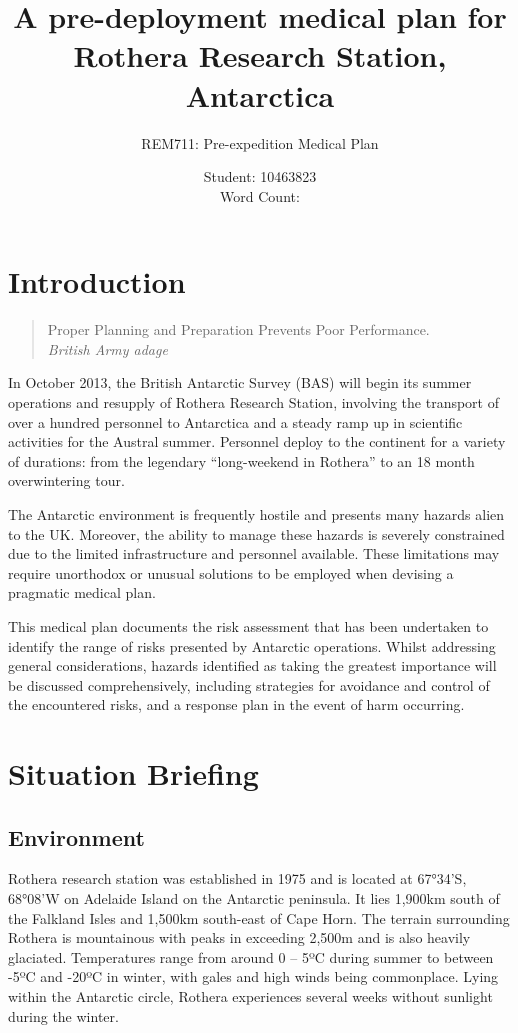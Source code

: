 \documentclass[12pt,a4paper]{article}
\title{A pre-deployment medical plan for Rothera Research Station, Antarctica}
\author{REM711: Pre-expedition Medical Plan}
\date{Student: 10463823 \\ Word Count: }
\begin{document}
\maketitle

\pagebreak

\tableofcontents

\pagebreak

\section{Introduction}

\begin{quote}
Proper Planning and Preparation Prevents Poor Performance. \\
\em British Army adage
\end{quote}

In October 2013, the British Antarctic Survey (BAS) will begin its summer operations and resupply of Rothera Research Station, involving the transport of over a hundred personnel to Antarctica and a steady ramp up in scientific activities for the Austral summer. Personnel deploy to the continent for a variety of durations: from the legendary ``long-weekend in Rothera'' to an 18 month overwintering tour.

The Antarctic environment is frequently hostile and presents many hazards alien to the UK. Moreover, the ability to manage these hazards is severely constrained due to the limited infrastructure and personnel available. These limitations may require unorthodox or unusual solutions to be employed when devising a pragmatic medical plan.

This medical plan documents the risk assessment that has been undertaken to identify the range of risks presented by Antarctic operations. Whilst addressing general considerations, hazards identified as taking the greatest importance will be discussed comprehensively, including strategies for avoidance and control of the encountered risks, and a response plan in the event of harm occurring.

\section{Situation Briefing}

\subsection{Environment}

Rothera research station was established in 1975 and is located at 67°34'S, 68°08'W on Adelaide Island on the Antarctic peninsula. It lies 1,900km south of the Falkland Isles and 1,500km south-east of Cape Horn. The terrain surrounding Rothera is mountainous with peaks in exceeding 2,500m and is also heavily glaciated. Temperatures range from around 0 -- 5ºC during summer to between -5ºC and -20ºC in winter, with gales and high winds being commonplace. Lying within the Antarctic circle, Rothera experiences several weeks without sunlight during the winter.
\end{document}
